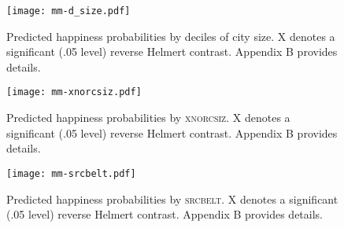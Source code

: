 \documentclass[12pt, letterpaper]{article}
\begin{document}
\begin{spacing}{1.9}


\begin{figure}[H]
  \texttt{[image: mm-d\_size.pdf]}\centering
  \caption{Predicted happiness probabilities by deciles of city size. X denotes
    a significant (.05 level)  reverse Helmert contrast. Appendix B provides details.}\label{postgr3_d_size}
\end{figure}

\begin{figure}[H]
  \texttt{[image: mm-xnorcsiz.pdf]}\centering
  \caption{Predicted happiness probabilities by {\textsc{xnorcsiz.}} X denotes a
    significant (.05 level) reverse Helmert contrast. Appendix B provides details.}\label{postgr3_xnorc_d_size}
\end{figure}

\begin{figure}[H]
 \texttt{[image: mm-srcbelt.pdf]}\centering
\caption{Predicted happiness probabilities by {\textsc{srcbelt}.} X denotes a
  significant (.05 level) reverse Helmert contrast. Appendix B provides details.}\label{postgr3_srcbelt_d_size}
\end{figure}


\end{spacing}
\end{document}
